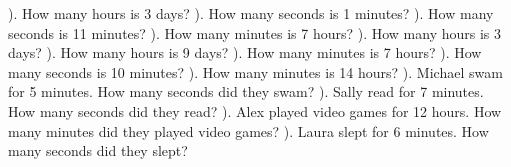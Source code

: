 \documentclass{article}%
\begin{document}
\newline%
\newline%
). How many hours is 3 days?%
\newline%
\newline%
). How many seconds is 1 minutes?%
\newline%
\newline%
). How many seconds is 11 minutes?%
\newline%
\newline%
). How many minutes is 7 hours?%
\newline%
\newline%
). How many hours is 3 days?%
\newline%
\newline%
). How many hours is 9 days?%
\newline%
\newline%
). How many minutes is 7 hours?%
\newline%
\newline%
). How many seconds is 10 minutes?%
\newline%
\newline%
). How many minutes is 14 hours?%
\newline%
\newline%
). Michael swam for 5 minutes. How many seconds did they swam?%
\newline%
\newline%
). Sally read for 7 minutes. How many seconds did they read?%
\newline%
\newline%
). Alex played video games for 12 hours. How many minutes did they played video games?%
\newline%
\newline%
). Laura slept for 6 minutes. How many seconds did they slept?%
\newline%
\end{document}

